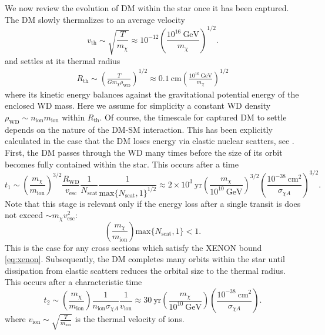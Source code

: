 \documentclass[preprintnumbers,amsmath,amssymb,prd,superscriptaddress]{revtex4}
\newcommand{\GeV}{\text{GeV}}
\newcommand{\cm}{\text{cm}}
\def\r{\right)}
\def\l{\left(}
\begin{document}
We now review the evolution of DM within the star once it has been captured. 
The DM slowly thermalizes to an average velocity
\begin{equation}
v_\text{th} \sim \sqrt{\frac{T}{m_\chi}} \approx 10^{-12} \l \frac{10^{16} ~\GeV}{m_\chi}\r^{1/2}.
\end{equation}
and settles at its thermal radius
\begin{align}
R_\text{th} \sim \l \frac{T}{G m_\chi \rho_\text{WD}}\r^{1/2} \approx 0.1 ~\cm \l \frac{10^{16} ~\GeV}{m_\chi}\r^{1/2} 
\end{align}
where its kinetic energy balances against the gravitational potential energy of the enclosed WD mass. 
Here we assume for simplicity a constant WD density $\rho_\text{WD} \sim n_\text{ion} m_\text{ion}$ within $R_\text{th}$.
Of course, the timescale for captured DM to settle depends on the nature of the DM-SM interaction.
This has been explicitly calculated in the case that the DM loses energy via elastic nuclear scatters, see \cite{Tinyakov}. 
First, the DM passes through the WD many times before the size of its orbit becomes fully contained within the star.
This occurs after a time
\begin{equation}
t_1 \sim \l \frac{m_\chi}{m_\text{ion}} \r^{3/2} \frac{R_\text{WD}}{v_\text{esc}} \frac{1}{N_\text{scat}} \frac{1}{\text{max}\{N_\text{scat}, 1\}^{1/2}} \approx 2 \times 10^{3} ~\text{yr} \l \frac{m_\chi}{10^{10} ~\GeV} \r^{3/2} \l \frac{10^{-38} ~\cm^2}{\sigma_{\chi A}} \r^{3/2}. 
\end{equation}
Note that this stage is relevant only if the energy loss after a single transit is does not exceed $\sim m_\chi v_\text{esc}^2$:
\begin{equation}
\l \frac{m_\chi}{m_\text{ion}} \r \text{max}\{N_\text{scat},1\} < 1. 
\end{equation}
This is the case for any cross sections which satisfy the XENON bound \eqref{eq:xenon}. 
Subsequently, the DM completes many orbits within the star until dissipation from elastic scatters reduces the orbital size to the thermal radius.
This occurs after a characteristic time
\begin{equation}
t_2 \sim \l \frac{m_\chi}{m_\text{ion}} \r \frac{1}{n_\text{ion} \sigma_{\chi A}} \frac{1}{v_\text{ion}} \approx 30 ~\text{yr} \l \frac{m_\chi}{10^{10} ~\GeV} \r \l \frac{10^{-38} ~\cm^2}{\sigma_{\chi A}} \r. 
\end{equation}
where $v_\text{ion} \sim \sqrt{\frac{T}{m_\text{ion}}}$ is the thermal velocity of ions. 
\end{document}
